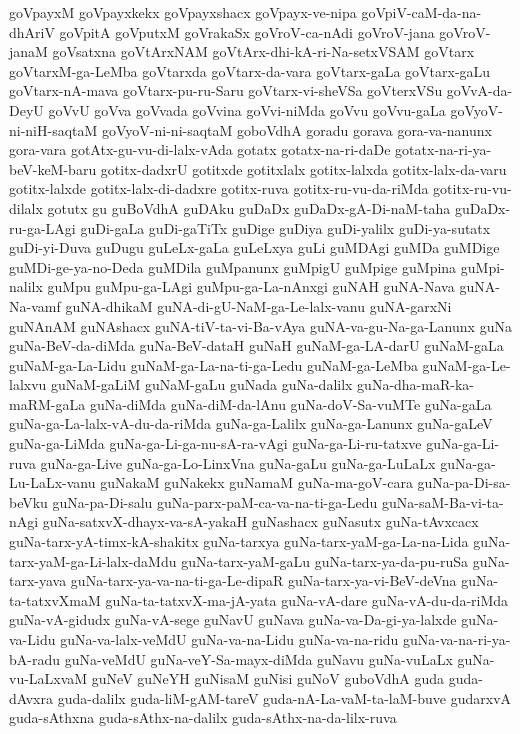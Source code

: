 {goVpayxM
goVpayxkekx
goVpayxshacx
goVpayx-ve-nipa
goVpiV-caM-da-na-dhAriV
goVpitA
goVputxM
goVrakaSx
goVroV-ca-nAdi
goVroV-jana
goVroV-janaM
goVsatxna
goVtArxNAM
goVtArx-dhi-kA-ri-Na-setxVSAM
goVtarx
goVtarxM-ga-LeMba
goVtarxda
goVtarx-da-vara
goVtarx-gaLa
goVtarx-gaLu
goVtarx-nA-mava
goVtarx-pu-ru-Saru
goVtarx-vi-sheVSa
goVterxVSu
goVvA-da-DeyU
goVvU
goVva
goVvada
goVvina
goVvi-niMda
goVvu
goVvu-gaLa
goVyoV-ni-niH-saqtaM
goVyoV-ni-ni-saqtaM
goboVdhA
goradu
gorava
gora-va-nanunx
gora-vara
gotAtx-gu-vu-di-lalx-vAda
gotatx
gotatx-na-ri-daDe
gotatx-na-ri-ya-beV-keM-baru
gotitx-dadxrU
gotitxde
gotitxlalx
gotitx-lalxda
gotitx-lalx-da-varu
gotitx-lalxde
gotitx-lalx-di-dadxre
gotitx-ruva
gotitx-ru-vu-da-riMda
gotitx-ru-vu-dilalx
gotutx
gu
guBoVdhA
guDAku
guDaDx
guDaDx-gA-Di-naM-taha
guDaDx-ru-ga-LAgi
guDi-gaLa
guDi-gaTiTx
guDige
guDiya
guDi-yalilx
guDi-ya-sutatx
guDi-yi-Duva
guDugu
guLeLx-gaLa
guLeLxya
guLi
guMDAgi
guMDa
guMDige
guMDi-ge-ya-no-Deda
guMDila
guMpanunx
guMpigU
guMpige
guMpina
guMpi-nalilx
guMpu
guMpu-ga-LAgi
guMpu-ga-La-nAnxgi
guNAH
guNA-Nava
guNA-Na-vamf
guNA-dhikaM
guNA-di-gU-NaM-ga-Le-lalx-vanu
guNA-garxNi
guNAnAM
guNAshacx
guNA-tiV-ta-vi-Ba-vAya
guNA-va-gu-Na-ga-Lanunx
guNa
guNa-BeV-da-diMda
guNa-BeV-dataH
guNaH
guNaM-ga-LA-darU
guNaM-gaLa
guNaM-ga-La-Lidu
guNaM-ga-La-na-ti-ga-Ledu
guNaM-ga-LeMba
guNaM-ga-Le-lalxvu
guNaM-gaLiM
guNaM-gaLu
guNada
guNa-dalilx
guNa-dha-maR-ka-maRM-gaLa
guNa-diMda
guNa-diM-da-lAnu
guNa-doV-Sa-vuMTe
guNa-gaLa
guNa-ga-La-lalx-vA-du-da-riMda
guNa-ga-Lalilx
guNa-ga-Lanunx
guNa-gaLeV
guNa-ga-LiMda
guNa-ga-Li-ga-nu-sA-ra-vAgi
guNa-ga-Li-ru-tatxve
guNa-ga-Li-ruva
guNa-ga-Live
guNa-ga-Lo-LinxVna
guNa-gaLu
guNa-ga-LuLaLx
guNa-ga-Lu-LaLx-vanu
guNakaM
guNakekx
guNamaM
guNa-ma-goV-cara
guNa-pa-Di-sa-beVku
guNa-pa-Di-salu
guNa-parx-paM-ca-va-na-ti-ga-Ledu
guNa-saM-Ba-vi-ta-nAgi
guNa-satxvX-dhayx-va-sA-yakaH
guNashacx
guNasutx
guNa-tAvxcacx
guNa-tarx-yA-timx-kA-shakitx
guNa-tarxya
guNa-tarx-yaM-ga-La-na-Lida
guNa-tarx-yaM-ga-Li-lalx-daMdu
guNa-tarx-yaM-gaLu
guNa-tarx-ya-da-pu-ruSa
guNa-tarx-yava
guNa-tarx-ya-va-na-ti-ga-Le-dipaR
guNa-tarx-ya-vi-BeV-deVna
guNa-ta-tatxvXmaM
guNa-ta-tatxvX-ma-jA-yata
guNa-vA-dare
guNa-vA-du-da-riMda
guNa-vA-gidudx
guNa-vA-sege
guNavU
guNava
guNa-va-Da-gi-ya-lalxde
guNa-va-Lidu
guNa-va-lalx-veMdU
guNa-va-na-Lidu
guNa-va-na-ridu
guNa-va-na-ri-ya-bA-radu
guNa-veMdU
guNa-veY-Sa-mayx-diMda
guNavu
guNa-vuLaLx
guNa-vu-LaLxvaM
guNeV
guNeYH
guNisaM
guNisi
guNoV
guboVdhA
guda
guda-dAvxra
guda-dalilx
guda-liM-gAM-tareV
guda-nA-La-vaM-ta-laM-buve
gudarxvA
guda-sAthxna
guda-sAthx-na-dalilx
guda-sAthx-na-da-lilx-ruva
}
